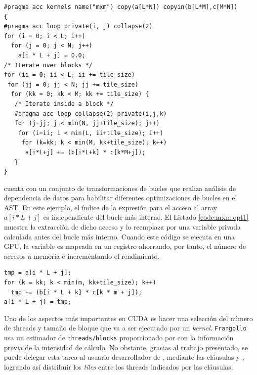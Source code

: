 \begin{lstlisting}[caption={\texttt{MxM} por bloques en OpenACC},label=code:mxm]
#pragma acc kernels name("mxm") copy(a[L*N]) copyin(b[L*M],c[M*N]) 
{
#pragma acc loop private(i, j) collapse(2)
for (i = 0; i < L; i++)
  for (j = 0; j < N; j++)
    a[i * L + j] = 0.0;
/* Iterate over blocks */
for (ii = 0; ii < L; ii += tile_size)
 for (jj = 0; jj < N; jj += tile_size)
  for (kk = 0; kk < M; kk += tile_size) {
   /* Iterate inside a block */
   #pragma acc loop collapse(2) private(i,j,k)
   for (j=jj; j < min(N, jj+tile_size); j++) 
    for (i=ii; i < min(L, ii+tile_size); i++)
     for (k=kk; k < min(M, kk+tile_size); k++)
      a[i*L+j] += (b[i*L+k] * c[k*M+j]);
   }
}
\end{lstlisting}

\yacf{}{} cuenta con un conjunto de transformaciones de bucles que realiza análisis de dependencia de datos para habilitar diferentes optimizaciones de bucles en el AST. En este ejemplo, el índice de la expresión para el acceso al array $a[i*L+j]$ es independiente del bucle más interno. El Listado \ref{code:mxm:opt1} muestra la extracción de dicho acceso y lo reemplaza por una variable privada calculada antes del bucle más interno. Cuando este código se ejecuta en una GPU, la variable es mapeada en un registro ahorrando, por tanto, el  número de accesos a memoria e incrementando el rendimiento. 

\begin{lstlisting}[caption={Extracción del acceso al array},label=code:mxm:opt1]
tmp = a[i * L + j];
for (k = kk; k < min(m, kk+tile_size); k++)
  tmp += (b[i * L + k] * c[k * m + j]);
a[i * L + j] = tmp;
\end{lstlisting}


Uno de los aspectos más importantes en CUDA es hacer una selección del número de threads y 
tamaño de bloque que va a ser ejecutado por un \textit{kernel}. \texttt{Frangollo} usa un 
estimador de \texttt{threads/blocks} proporcionado por \yacf{}{} con la información previa 
de la intensidad de cálculo. No obstante, gracias al trabajo presentado, se puede delegar 
esta tarea al usuario desarrollador de \accULL{}, mediante las cláusulas \gang{} y 
\worker{}, logrando así distribuir los \textit{tiles} entre los threads indicados por 
las cláusulas. 

